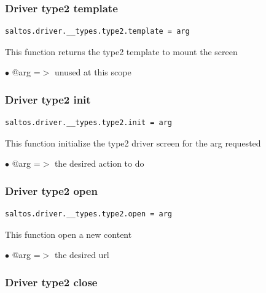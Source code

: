 \documentclass[a4paper]{article}
\begin{document}
\hypertarget{toc187}{}
\subsubsection{Driver type2 template}

\begin{lstlisting}
saltos.driver.__types.type2.template = arg
\end{lstlisting}

This function returns the type2 template to mount the screen

\begin{compactitem}
\item[\color{myblue}$\bullet$] @arg =$>$ unused at this scope
\end{compactitem}

\hypertarget{toc188}{}
\subsubsection{Driver type2 init}

\begin{lstlisting}
saltos.driver.__types.type2.init = arg
\end{lstlisting}

This function initialize the type2 driver screen for the arg requested

\begin{compactitem}
\item[\color{myblue}$\bullet$] @arg =$>$ the desired action to do
\end{compactitem}

\hypertarget{toc189}{}
\subsubsection{Driver type2 open}

\begin{lstlisting}
saltos.driver.__types.type2.open = arg
\end{lstlisting}

This function open a new content

\begin{compactitem}
\item[\color{myblue}$\bullet$] @arg =$>$ the desired url
\end{compactitem}

\hypertarget{toc190}{}
\subsubsection{Driver type2 close}
\end{document}
